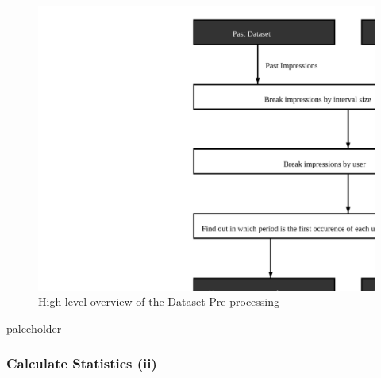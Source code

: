 \begin{figure}[h] \begin{center} \leavevmode
\includegraphics[]{pre_processing_i} \caption{ High level overview
of the Dataset Pre-processing} \label{fig:pre_processing_i} \end{center} \end{figure}

palceholder

\subsubsection{Calculate Statistics (ii)}

